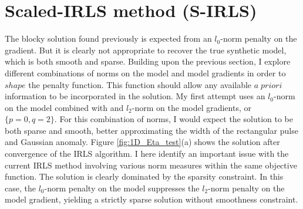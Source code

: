 \newpage
\section{Scaled-IRLS method (S-IRLS)}\label{S-IRLS}
The blocky solution found previously is expected from an $l_0$-norm penalty on the gradient. But it is clearly not appropriate to recover  the true synthetic model, which is both smooth and sparse.
Building upon the previous section, I explore different combinations of norms on the model and model gradients in order to $shape$ the penalty function. This function should allow any available $a\;priori$ information to be incorporated in the solution.
My first attempt uses an $l_0$-norm on the model combined with and $l_2$-norm on the model gradients, or $\{p=0 , q = 2\}$.
For this combination of norms, I would expect the solution to be both sparse and smooth, better approximating the width of the rectangular pulse and Gaussian anomaly.
Figure \ref{fig:1D_Eta_test}(a) shows the solution after convergence of the IRLS algorithm.
I here identify an important issue with the current IRLS method involving various norm measures within the same objective function. 
The solution is clearly dominated by the sparsity constraint. 
In this case, the $l_0$-norm penalty on the model suppresses the $l_2$-norm penalty on the model gradient, yielding a strictly sparse solution without smoothness constraint.

